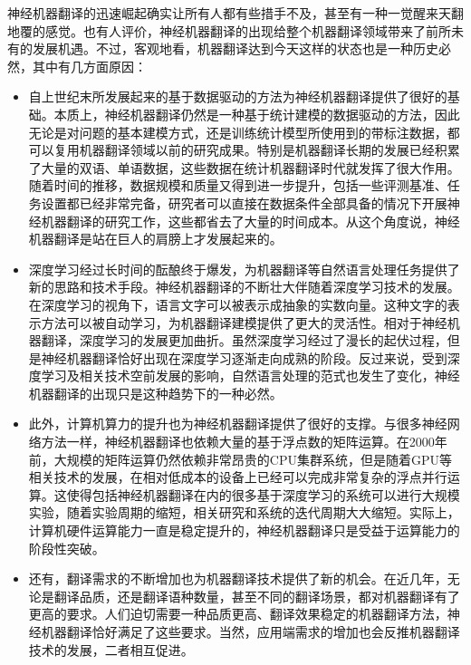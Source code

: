 \parinterval 神经机器翻译的迅速崛起确实让所有人都有些措手不及，甚至有一种一觉醒来天翻地覆的感觉。也有人评价，神经机器翻译的出现给整个机器翻译领域带来了前所未有的发展机遇。不过，客观地看，机器翻译达到今天这样的状态也是一种历史必然，其中有几方面原因：

\begin{itemize}
\vspace{0.3em}
\item 自上世纪末所发展起来的基于数据驱动的方法为神经机器翻译提供了很好的基础。本质上，神经机器翻译仍然是一种基于统计建模的数据驱动的方法，因此无论是对问题的基本建模方式，还是训练统计模型所使用到的带标注数据，都可以复用机器翻译领域以前的研究成果。特别是机器翻译长期的发展已经积累了大量的双语、单语数据，这些数据在统计机器翻译时代就发挥了很大作用。随着时间的推移，数据规模和质量又得到进一步提升，包括一些评测基准、任务设置都已经非常完备，研究者可以直接在数据条件全部具备的情况下开展神经机器翻译的研究工作，这些都省去了大量的时间成本。从这个角度说，神经机器翻译是站在巨人的肩膀上才发展起来的。
\vspace{0.3em}
\item 深度学习经过长时间的酝酿终于爆发，为机器翻译等自然语言处理任务提供了新的思路和技术手段。神经机器翻译的不断壮大伴随着深度学习技术的发展。在深度学习的视角下，语言文字可以被表示成抽象的实数向量。这种文字的表示方法可以被自动学习，为机器翻译建模提供了更大的灵活性。相对于神经机器翻译，深度学习的发展更加曲折。虽然深度学习经过了漫长的起伏过程，但是神经机器翻译恰好出现在深度学习逐渐走向成熟的阶段。反过来说，受到深度学习及相关技术空前发展的影响，自然语言处理的范式也发生了变化，神经机器翻译的出现只是这种趋势下的一种必然。
\vspace{0.3em}
\item 此外，计算机算力的提升也为神经机器翻译提供了很好的支撑。与很多神经网络方法一样，神经机器翻译也依赖大量的基于浮点数的矩阵运算。在2000年前，大规模的矩阵运算仍然依赖非常昂贵的CPU集群系统，但是随着GPU等相关技术的发展，在相对低成本的设备上已经可以完成非常复杂的浮点并行运算。这使得包括神经机器翻译在内的很多基于深度学习的系统可以进行大规模实验，随着实验周期的缩短，相关研究和系统的迭代周期大大缩短。实际上，计算机硬件运算能力一直是稳定提升的，神经机器翻译只是受益于运算能力的阶段性突破。
\vspace{0.3em}
\item 还有，翻译需求的不断增加也为机器翻译技术提供了新的机会。在近几年，无论是翻译品质，还是翻译语种数量，甚至不同的翻译场景，都对机器翻译有了更高的要求。人们迫切需要一种品质更高、翻译效果稳定的机器翻译方法，神经机器翻译恰好满足了这些要求。当然，应用端需求的增加也会反推机器翻译技术的发展，二者相互促进。
\vspace{0.3em}
\end{itemize}

